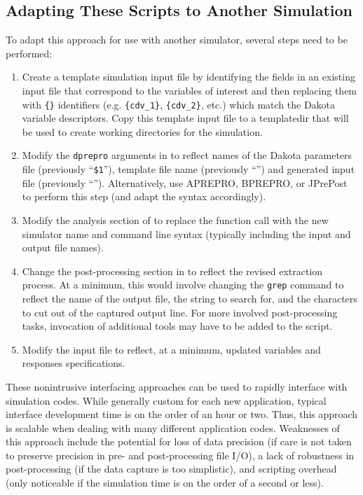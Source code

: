 \subsection{Adapting These Scripts to Another Simulation}

To adapt this approach for use with another simulator, several steps
need to be performed:

\begin{enumerate}
\item Create a template simulation input file by identifying the fields
  in an existing input file that correspond to the variables of
  interest and then replacing them with \texttt{\{\}} identifiers
  (e.g. \texttt{\{cdv\_1\}}, \texttt{\{cdv\_2\}}, etc.) which match
  the Dakota variable descriptors. Copy this template input file to a
  templatedir that will be used to create working directories for the
  simulation.

\item Modify the \texttt{dprepro} arguments in
   to reflect names of the Dakota parameters
  file (previously ``\texttt{\$1}''), template file name
  (previously ``'') and generated input file
  (previously ``''). Alternatively, use APREPRO,
  BPREPRO, or JPrePost to perform this step (and adapt the syntax
  accordingly).

\item Modify the analysis section of  to
  replace the  function call with the new
  simulator name and command line syntax (typically including the
  input and output file names).

\item Change the post-processing section in 
  to reflect the revised extraction process. At a minimum, this would
  involve changing the \texttt{grep} command to reflect the name of
  the output file, the string to search for, and the characters to cut
  out of the captured output line. For more involved post-processing
  tasks, invocation of additional tools may have to be added to the
  script.

\item Modify the  input file to reflect,
  at a minimum, updated variables and responses specifications.
\end{enumerate}

These nonintrusive interfacing approaches can be used to rapidly
interface with simulation codes. While generally custom for each new
application, typical interface development time is on the order of an
hour or two. Thus, this approach is scalable when dealing with many
different application codes. Weaknesses of this approach include the
potential for loss of data precision (if care is not taken to preserve
precision in pre- and post-processing file I/O), a lack of robustness
in post-processing (if the data capture is too simplistic), and
scripting overhead (only noticeable if the simulation time is on the
order of a second or less).

